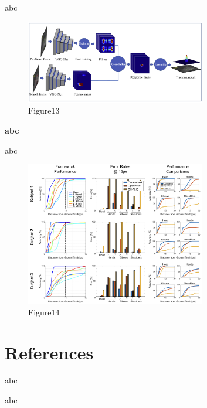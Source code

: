 \documentclass[12pt]{article}
\begin{document}
\noindent abc

\begin{figure}[H]
\centering
\includegraphics[width=0.7\textwidth]{Paper9.pic.jpg}
\caption{Figure13} 
\end{figure}

\noindent \textbf{abc}

\noindent abc

\begin{figure}[H]
\centering
\includegraphics[width=0.7\textwidth]{Paper10.pic.jpg}
\caption{Figure14} 
\end{figure}

\newpage
\section{References}
abc

\noindent abc
\end{document}
